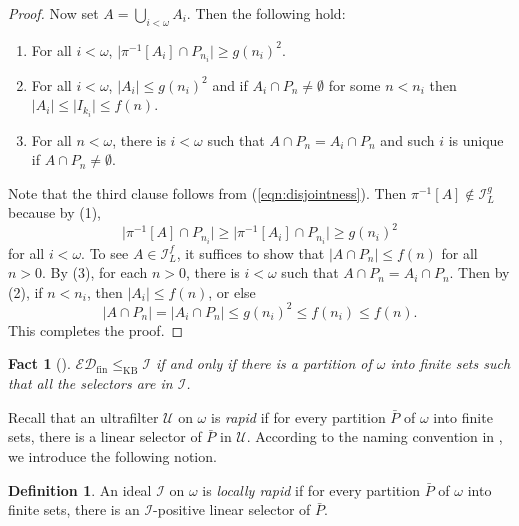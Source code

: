 \documentclass[a4paper,12pt]{amsart}
\newtheorem{fac}[thm]{Fact}
\theoremstyle{definition}
\newtheorem{dfn}[thm]{Definition}
\numberwithin{thm}{section}
\numberwithin{equation}{section}
\newcommand{\I}{\mathscr{I}}
\begin{document}
\begin{proof}
    	Now set $A = \bigcup_{i<\omega}A_i$. Then the following hold:
    	\begin{enumerate}
    		\item For all $i<\omega$, $\lvert\pi^{-1}[A_i]\cap P_{n_i}\rvert \geq g(n_i)^2$.
    		\item For all $i<\omega$, $\lvert A_i\rvert\leq g(n_i)^2$ and if $A_i\cap P_n\neq\emptyset$ for some $n < n_i$ then $\lvert A_i\rvert\leq \lvert I_{k_i}\rvert\leq f(n)$.
    		\item For all $n<\omega$, there is $i<\omega$ such that $A\cap P_n = A_i \cap P_n$ and such $i$ is unique if $A\cap P_n \neq\emptyset$.
    	\end{enumerate}
    	Note that the third clause follows from (\ref{eqn:disjointness}). Then $\pi^{-1}[A]\notin\I_L^g$ because by (1),
    	\[
    	\lvert\pi^{-1}[A]\cap P_{n_i}\rvert \geq \lvert\pi^{-1}[A_i]\cap P_{n_i}\rvert\geq g(n_i)^2
    	\]
    	for all $i<\omega$. To see $A\in\I_L^f$, it suffices to show that $\lvert A\cap P_n\rvert\leq f(n)$ for all $n>0$. By (3), for each $n>0$, there is $i<\omega$ such that $A\cap P_n = A_i\cap P_n$. Then by (2), if $n < n_i$, then $\lvert A_i\rvert\leq f(n)$, or else
    	\[
    	\lvert A\cap P_n\rvert = \lvert A_i \cap P_n\rvert \leq g(n_i)^2 \leq f(n_i) \leq f(n).
    	\]
    	This completes the proof.
    \end{proof}
        
    \begin{fac}[{\cite[Theorem 2.2]{HMTU17}}]
    	\label{fac:EDfin_chara}
    	$\mathcal{ED}_\mathrm{fin}\leq_{\mathrm{KB}}\I$ if and only if there is a partition of $\omega$ into finite sets such that all the selectors are in $\I$.
    \end{fac}
    
    
    Recall that an ultrafilter $\mathcal{U}$ on $\omega$ is \emph{rapid} if for every partition $\bar{P}$ of $\omega$ into finite sets, there is a linear selector of $\bar{P}$ in $\mathcal{U}$. According to the naming convention in \cite{BTW82}, we introduce the following notion.
    
    \begin{dfn}
        An ideal $\I$ on $\omega$ is \emph{locally rapid} if for every partition $\bar{P}$ of $\omega$ into finite sets, there is an $\I$-positive linear selector of $\bar{P}$.
    \end{dfn}
\end{document}
